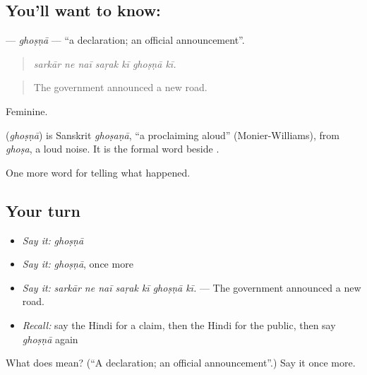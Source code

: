 \subsection*{You'll want to know: }
\textbf{} — \emph{ghoṣṇā} — \textquotedblleft{}a declaration; an official announcement\textquotedblright{}.

\begin{quote}
      
\end{quote}

\begin{quote}
\emph{sarkār ne naī saṛak kī ghoṣṇā kī.}
\end{quote}

\begin{quote}
The government announced a new road.
\end{quote}

Feminine.

\begin{cousinweb}
\textbf{} (\emph{ghoṣṇā}) is Sanskrit \emph{ghoṣaṇā}, \textquotedblleft{}a proclaiming aloud\textquotedblright{} (Monier-Williams), from \emph{ghoṣa}, a loud noise. It is the formal word beside \textbf{}.
\end{cousinweb}

\begin{grammarlens}[title={What you've built}]
One more word for telling what happened.
\end{grammarlens}

\subsection*{Your turn}
\begin{itemize}
\raggedright
  \item \emph{Say it:} \emph{ghoṣṇā}
  \item \emph{Say it:} \emph{ghoṣṇā}, once more
  \item \emph{Say it:} \emph{sarkār ne naī saṛak kī ghoṣṇā kī.} — The government announced a new road.
  \item \emph{Recall:} say the Hindi for a claim, then the Hindi for the public, then say \emph{ghoṣṇā} again
\end{itemize}

\begin{tcolorbox}[breakable,colback=teal!4,colframe=teal!35!black,title={Before you move on}]
What does  mean? (\textquotedblleft{}A declaration; an official announcement\textquotedblright{}.) Say it once more.
\end{tcolorbox}
